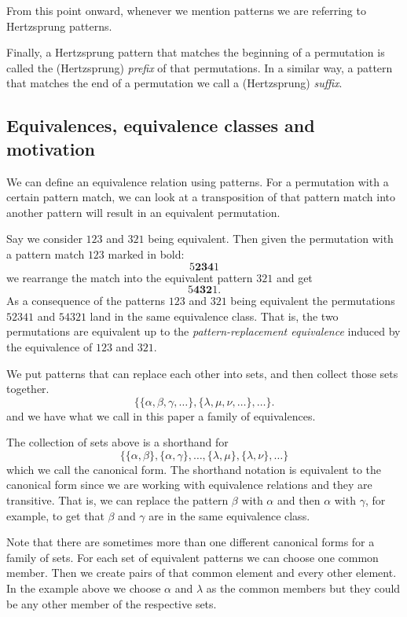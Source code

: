 \documentclass[a4paper, 11pt, english]{article}
\theoremstyle{definition}
\begin{document}
From this point onward, whenever we mention patterns we are referring to
Hertzsprung patterns.

Finally, a Hertzsprung pattern that matches the beginning of a permutation is
called the (Hertzsprung) \emph{prefix} of that permutations. In a similar way, a pattern
that matches the end of a permutation we call a (Hertzsprung) \emph{suffix}.

\subsection{Equivalences, equivalence classes and motivation}
We can define an equivalence relation using patterns. For a permutation with a certain pattern
match, we can look at a transposition of that pattern match into another pattern will result in an
equivalent permutation. 

Say we consider $123$ and $321$ being equivalent. Then given the
permutation with a pattern match $123$ marked in bold:
\[
  5\bm{234}1
\]
we rearrange the match into the equivalent pattern $321$ and get
\[
  5\bm{432}1.
\]
As a consequence of the patterns $123$ and $321$ being equivalent the permutations $52341$ and
$54321$ land in the same equivalence class. That is, the two permutations are equivalent up to the
\emph{pattern-replacement equivalence} induced by the equivalence of $123$ and $321$.

We put patterns that can replace each other into sets, and then collect those sets together. 
\[
    \{ \{\alpha, \beta, \gamma, \dots \}, \{\lambda, \mu, \nu, \dots \}, \dots
    \}.
\]
and we have what we call in this paper a family of equivalences.

The collection of sets above is a shorthand for
\[
    \{ \{ \alpha, \beta \}, \{ \alpha, \gamma \}, \dots, \{ \lambda, \mu \}, \{
        \lambda, \nu \}, \dots \}
\] 
which we call the canonical form. The shorthand notation is equivalent to the canonical form since
we are working with equivalence relations and they are transitive.
That is, we can replace the pattern $\beta$ with $\alpha$ and then $\alpha$ with $\gamma$, for
example, to get that $\beta$ and $\gamma$ are in the same equivalence class.

Note that there are sometimes more than one different canonical forms for a family of sets. For each 
set of equivalent patterns we can choose one common member. Then we create pairs of that common
element and every other element. In the example above we choose $\alpha$ and $\lambda$ as the common members
but they could be any other member of the respective sets.
\end{document}
